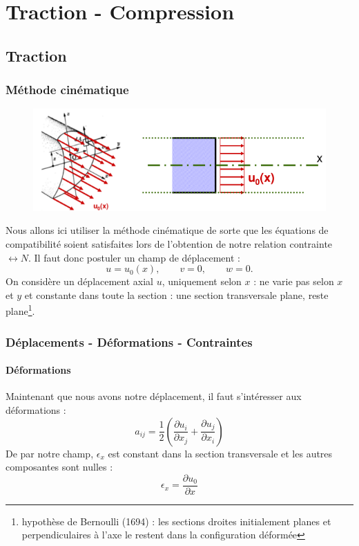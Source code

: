 \chapter{Traction - Compression}
\section{Traction}
	\subsection{Méthode cinématique}
	\begin{figure}
	\vspace{-5mm}
	\includegraphics[scale=0.4]{ch3/image1.png}
	\end{figure}
	Nous allons ici utiliser la méthode cinématique de sorte que les équations 
	de compatibilité soient satisfaites lors de l'obtention de notre relation 
	contrainte $\leftrightarrow N$. Il faut donc postuler un champ de 
	déplacement :
	\begin{equation}
	u = u_0(x),\qquad v=0,\qquad w=0.
	\end{equation}
	On considère un déplacement axial $u$, uniquement selon $x$ : ne varie 
	pas selon $x$ et $y$ et constante dans toute la section : une section 
	transversale plane, reste plane\footnote{hypothèse de Bernoulli (1694) :
	les sections droites initialement planes et perpendiculaires à l'axe le 
	restent dans la configuration déformée}.
	
	\subsection{Déplacements - Déformations - Contraintes}
		\subsubsection{Déformations}
		Maintenant que nous avons notre déplacement, il faut s'intéresser 
		aux déformations :
		\begin{equation}
		a_{ij} = \frac{1}{2}\left(\dfrac{\partial u_i}{\partial x_j}+\dfrac{
		\partial u_j}{\partial x_i}\right)
		\end{equation}
		De par notre champ, $\epsilon_x$ est constant dans la section 
		transversale et les autres composantes sont nulles :
		\begin{equation}
		\epsilon_x = \dfrac{\partial u_0}{\partial x}
		\end{equation}
		
